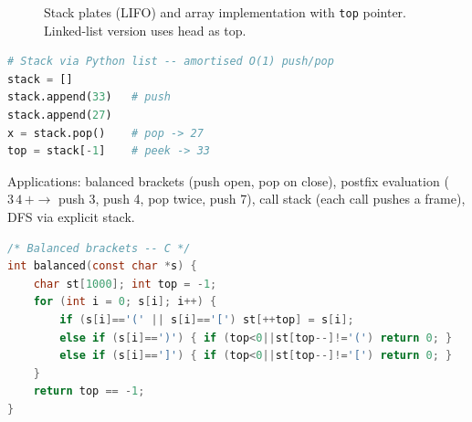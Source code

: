 \begin{figure}[h]
\centering
{}
\caption{Stack plates (LIFO) and array implementation with \texttt{top} pointer. Linked-list version uses head as top.}
\label{fig:stack}
\end{figure}

\begin{lstlisting}[language=Python]
# Stack via Python list -- amortised O(1) push/pop
stack = []
stack.append(33)   # push
stack.append(27)
x = stack.pop()    # pop -> 27
top = stack[-1]    # peek -> 33
\end{lstlisting}

Applications: balanced brackets (push open, pop on close), postfix evaluation ($3\,4\,+\to$ push 3, push 4, pop twice, push 7), call stack (each call pushes a frame), DFS via explicit stack.

\begin{lstlisting}[language=C]
/* Balanced brackets -- C */
int balanced(const char *s) {
    char st[1000]; int top = -1;
    for (int i = 0; s[i]; i++) {
        if (s[i]=='(' || s[i]=='[') st[++top] = s[i];
        else if (s[i]==')') { if (top<0||st[top--]!='(') return 0; }
        else if (s[i]==']') { if (top<0||st[top--]!='[') return 0; }
    }
    return top == -1;
}
\end{lstlisting}

